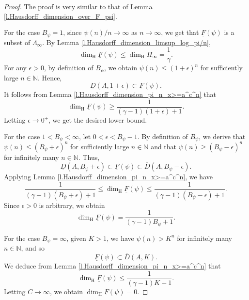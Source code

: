 \documentclass[12pt,reqno]{amsart}
\renewcommand{\=}{\coloneqq}
\theoremstyle{plain}
\begin{document}
\begin{proof}
The proof is very similar to that of Lemma \ref{l.Hausdorff_dimension_over_F_psi}.

  For the case $B_\psi=1$, since $\psi(n)/n\to \infty$ as $n\to \infty$,
    we get that $\underline{F}(\psi)$ is a subset of $\Lambda_{\infty}.$
    By Lemma \ref{l.Hausdorff_dimension_limsup_log_pi/n},
    \begin{equation*}
         \dim_{\mathrm{H}}\underline{F}(\psi)
         \leq  \dim_{\mathrm{H}} \Pi_{\infty}
         =\frac{1}{\gamma}.
    \end{equation*}
  For any $\epsilon>0$, by definition of $B_\psi$, we obtain $\psi(n)\leq (1+\epsilon)^n$ for sufficiently large $n \in \mathbb N$. Hence,
 \begin{equation*}
        \underline{D}(A,1+\epsilon)\subset \underline{F}(\psi).
    \end{equation*}
 It follows from Lemma \ref{l.Hausdorff_dimension_pi_n_x>=a^c^n} that $$\dim_{\mathrm{H}}\underline{F}(\psi)\geq \frac{1}{(\gamma-1)(1+\epsilon)+1}.$$ Letting $\epsilon \to 0^{+}$, we get the desired lower bound.


 For the case $1<B_\psi<\infty$, let $0<\epsilon<B_\psi-1$. By definition of $B_\psi$, we derive that $\psi(n)\leq (B_\psi+\epsilon)^{n}$ for sufficiently large $n \in \mathbb N$ and that $\psi(n)\geq (B_\psi-\epsilon)^{n}$ for infinitely many $n \in \mathbb N$. Thus,
 \begin{equation*}
        \underline{D}(A,B_\psi+\epsilon)
        \subset
        \underline{F}(\psi)
        \subset
        \overline{D}(A,B_\psi-\epsilon).
    \end{equation*}
Applying Lemma \ref{l.Hausdorff_dimension_pi_n_x>=a^c^n}, we have
    \begin{equation*}
        \frac{1}{(\gamma-1)(B_\psi+\epsilon)+1}\leq
        \dim_{\mathrm{H}}\underline{F}(\psi)
        \leq
        \frac{1}{(\gamma-1)(B_\psi-\epsilon)+1}.
    \end{equation*}
    Since $\epsilon>0$ is arbitrary, we obtain
    $$\dim_{\mathrm{H}}\underline{F}(\psi)=\frac{1}{(\gamma-1)B_\psi+1}.$$


For the case $B_\psi=\infty$, given $K>1$, we have $\psi(n)>K^n$ for infinitely many $n \in \mathbb N$, and so
  \begin{equation*}
        \underline{F}(\psi)\subset
        \overline{D}(A,K).
    \end{equation*}
We deduce from Lemma \ref{l.Hausdorff_dimension_pi_n_x>=a^c^n} that $$\dim_{\mathrm{H}}\underline{F}(\psi)\leq \frac{1}{(\gamma-1)K+1}.$$
Letting $C\to \infty$, we obtain $\dim_{\mathrm{H}}\underline{F}(\psi)=0$.
\end{proof}
\end{document}
